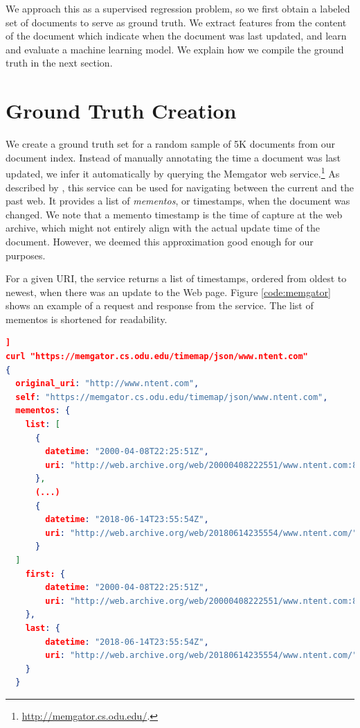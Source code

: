 We approach this as a supervised regression problem, so we first obtain a labeled set of documents to serve as ground truth. We extract features from the content of the document which indicate when the document was last updated, and learn and evaluate a machine learning model. We explain how we compile the ground truth in the next section.

\section{Ground Truth Creation}
We create a ground truth set for a random sample of 5K documents from our document index. Instead of manually annotating the time a document was last updated, we infer it automatically by querying the Memgator web service.\footnote{\url{http://memgator.cs.odu.edu/}.} As described by \citet{salaheldeen2013carbon}, this service can be used for navigating between the current and the past web. It provides a list of \textit{mementos}, or timestamps, when the document was changed. We note that a memento timestamp is the time of capture at the web archive, which might not entirely align with the actual update time of the document. However, we deemed this approximation good enough for our purposes.

For a given URI, the service returns a list of timestamps, ordered from oldest to newest, when there was an update to the Web page. Figure \ref{code:memgator} shows an example of a request and response from the service. The list of mementos is shortened for readability.

\begin{lstlisting}[language=json,firstnumber=1,caption=Example of a request to and response from the Memgator web service., label=code:memgator]]
curl "https://memgator.cs.odu.edu/timemap/json/www.ntent.com"
{
  original_uri: "http://www.ntent.com",
  self: "https://memgator.cs.odu.edu/timemap/json/www.ntent.com",
  mementos: {
    list: [
      {
        datetime: "2000-04-08T22:25:51Z",
        uri: "http://web.archive.org/web/20000408222551/www.ntent.com:80/"
      },
      (...)
      {
        datetime: "2018-06-14T23:55:54Z",
        uri: "http://web.archive.org/web/20180614235554/www.ntent.com/"
      }
  ]
    first: {
        datetime: "2000-04-08T22:25:51Z",
        uri: "http://web.archive.org/web/20000408222551/www.ntent.com:80/"
    },
    last: {
        datetime: "2018-06-14T23:55:54Z",
        uri: "http://web.archive.org/web/20180614235554/www.ntent.com/"
    }
  }
\end{lstlisting}


